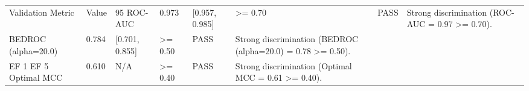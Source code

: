 \begin{tabular}{llllll}
\toprule
Validation Metric & Value & 95%
\midrule
ROC-AUC & 0.973 & [0.957, 0.985] & >= 0.70 & PASS & Strong discrimination (ROC-AUC = 0.97 >= 0.70). \\
BEDROC (alpha=20.0) & 0.784 & [0.701, 0.855] & >= 0.50 & PASS & Strong discrimination (BEDROC (alpha=20.0) = 0.78 >= 0.50). \\
EF 1%
EF 5%
Optimal MCC & 0.610 & N/A & >= 0.40 & PASS & Strong discrimination (Optimal MCC = 0.61 >= 0.40). \\
\bottomrule
\end{tabular}
